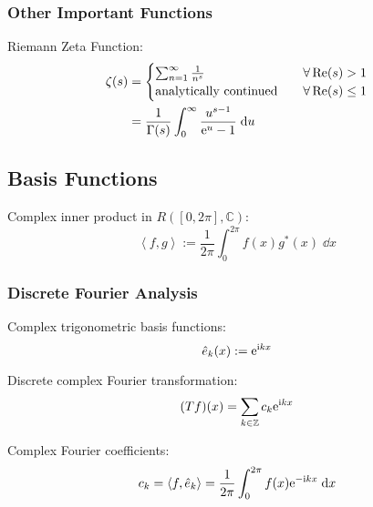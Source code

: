 		\subsubsection{Other Important Functions}
			Riemann Zeta Function:
			\begin{equation}
				\begin{aligned}
					\zeta(s) &= \begin{cases}
						\sum_{n=1}^{\infty} \frac{1}{n^s} \quad &\forall \Re(s) > 1\\
						\text{analytically continued} \quad &\forall \Re(s) \le 1\\
					\end{cases} \\
					&= \frac{1}{\Gamma(s)}\int_{0}^{\infty} \frac{u^{s-1}}{\mathrm{e}^u-1} \;\dd u \\				
				\end{aligned}
			\end{equation}

	\subsection{Basis Functions}
		\noindent
		Complex inner product in $R([0,2\pi],\mathbb{C})$:
		\begin{equation}
			\left<f,g\right>:=\frac{1}{2\pi}\int_0^{2\pi} f(x)g^* (x)\;\dd x
		\end{equation}

		\subsubsection{Discrete Fourier Analysis}
			\noindent
			Complex trigonometric basis functions:
			\begin{equation}
				\hat{e}_k(x):=\mathrm{e}^{\mathrm{i} kx}
			\end{equation}

			\noindent
			Discrete complex Fourier transformation:
			\begin{equation}
				(Tf)(x)=\sum_{k\in\mathbb{Z}}c_k \mathrm{e}^{\mathrm{i} kx}
			\end{equation}

			\noindent
			Complex Fourier coefficients:
			\begin{equation}
				c_k = \left<f,\hat{e}_k\right>=\frac{1}{2\pi}\int_0^{2\pi}f(x)\mathrm{e}^{-\mathrm{i} kx}\;\dd x
			\end{equation}

